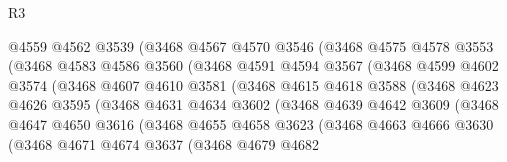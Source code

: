 \begin{lexlean}{R3}
\begin{coremodule}
                      @4559
                      @4562
                      @3539
                      (@3468
                        @4567
                        @4570
                        @3546
                        (@3468
                          @4575
                          @4578
                          @3553
                          (@3468
                            @4583
                            @4586
                            @3560
                            (@3468
                              @4591
                              @4594
                              @3567
                              (@3468
                                @4599
                                @4602
                                @3574
                                (@3468
                                  @4607
                                  @4610
                                  @3581
                                  (@3468
                                    @4615
                                    @4618
                                    @3588
                                    (@3468
                                      @4623
                                      @4626
                                      @3595
                                      (@3468
                                        @4631
                                        @4634
                                        @3602
                                        (@3468
                                          @4639
                                          @4642
                                          @3609
                                          (@3468
                                            @4647
                                            @4650
                                            @3616
                                            (@3468
                                              @4655
                                              @4658
                                              @3623
                                              (@3468
                                                @4663
                                                @4666
                                                @3630
                                                (@3468
                                                  @4671
                                                  @4674
                                                  @3637
                                                  (@3468
                                                    @4679
                                                    @4682

\end{coremodule}
\end{lexlean}
